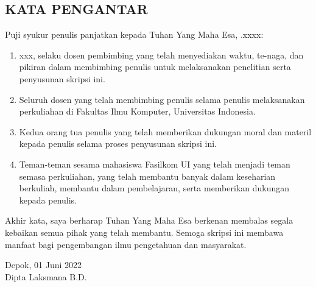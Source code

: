 {
    \newpage
    \begin{center}
        \section*{\centering KATA PENGANTAR}
    \end{center}
    \thispagestyle{nouniversityname}
    \noindentpar
    Puji syukur penulis panjatkan kepada Tuhan Yang Maha Esa, .xxxx:
    \begin{enumerate}
        \item xxx, selaku dosen pembimbing yang telah menyediakan waktu, te-naga, dan
        pikiran dalam membimbing penulis untuk melaksanakan penelitian serta
        penyusunan skripsi ini.
        \item Seluruh dosen yang telah membimbing penulis selama penulis melaksanakan
        perkuliahan di Fakultas Ilmu Komputer, Universitas Indonesia.
        \item Kedua orang tua penulis yang telah memberikan dukungan moral dan materil
        kepada penulis selama proses penyusunan skripsi ini.
        \item Teman-teman sesama mahasiswa Fasilkom UI yang telah menjadi teman semasa
        perkuliahan, yang telah membantu banyak dalam keseharian berkuliah, membantu
        dalam pembelajaran, serta memberikan dukungan kepada penulis.
    \end{enumerate}
    \noindentpar
    Akhir kata, saya berharap Tuhan Yang Maha Esa berkenan membalas segala kebaikan
    semua pihak yang telah membantu. Semoga skripsi ini membawa manfaat bagi
    pengembangan ilmu pengetahuan dan masyarakat.
    \vspace{2cm}

    \begin{flushright}
        \noindentpar
        Depok, 01 Juni 2022\\
        \vspace{1.5cm}
        Dipta Laksmana B.D.   
    \end{flushright}
}